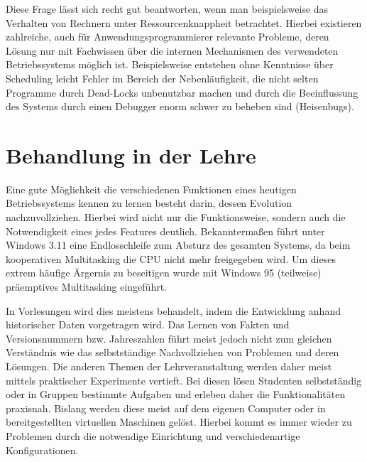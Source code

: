		Diese Frage lässt sich recht gut beantworten, wenn man beispielsweise das Verhalten von Rechnern unter Ressourcenknappheit betrachtet.
		Hierbei existieren zahlreiche, auch für Anwendungsprogrammierer relevante Probleme, deren Lösung nur mit Fachwissen über die internen Mechanismen des verwendeten Betriebssystems möglich ist. 
		Beispielsweise entstehen ohne Kenntnisse über Scheduling leicht Fehler im Bereich der Nebenläufigkeit, die nicht selten Programme durch Dead-Locks unbenutzbar machen und durch die Beeinflussung des Systems durch einen Debugger enorm schwer zu beheben sind (Heisenbugs).





\section{Behandlung in der Lehre}
\label{sec:teaching}

		Eine gute Möglichkeit die verschiedenen Funktionen eines heutigen Betriebssystems kennen zu lernen besteht darin, dessen Evolution nachzuvollziehen. Hierbei wird nicht nur die Funktionsweise, sondern auch die Notwendigkeit eines jedes Features deutlich. 
		Bekanntermaßen führt unter Windows 3.11 eine Endlosschleife zum Absturz des gesamten Systems, da beim kooperativen Multitasking die CPU nicht mehr freigegeben wird.
		Um dieses extrem häufige Ärgernis zu beseitigen wurde mit Windows 95 (teilweise) präemptives Multitasking eingeführt.

		In Vorlesungen wird dies meistens behandelt, indem  die Entwicklung anhand historischer Daten vorgetragen wird.
		Das Lernen von Fakten und Versionsnummern bzw. Jahreszahlen führt meist jedoch nicht zum gleichen Verständnis wie das selbstständige Nachvollziehen von Problemen und deren Lösungen.
		Die anderen Themen der Lehrveranstaltung werden daher meist mittels praktischer Experimente vertieft.
		Bei diesen lösen Studenten selbstständig oder in Gruppen bestimmte Aufgaben und erleben daher die Funktionalitäten praxisnah.
		Bislang werden diese meist auf dem eigenen Computer oder in bereitgestellten virtuellen Maschinen gelöst.
		Hierbei kommt es immer wieder zu Problemen durch die notwendige Einrichtung und verschiedenartige Konfigurationen.

